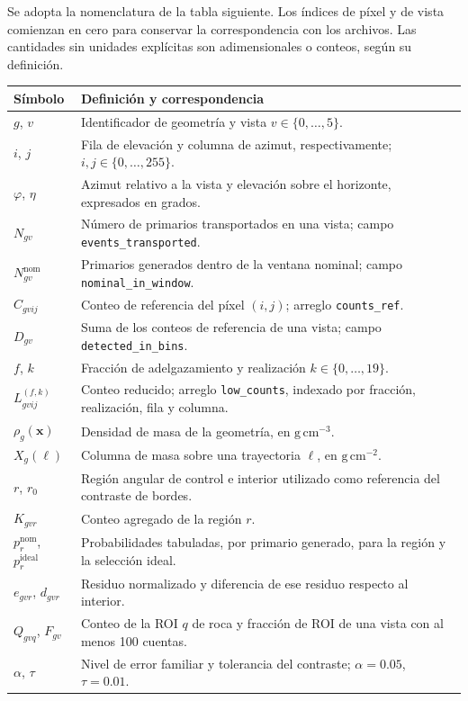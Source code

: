 \documentclass[11pt,a4paper]{article}
\begin{document}
Se adopta la nomenclatura de la tabla siguiente. Los índices de píxel y de vista comienzan en cero para conservar la correspondencia con los archivos. Las cantidades sin unidades explícitas son adimensionales o conteos, según su definición.

\begingroup\small\begin{longtable}{p{}p{}}
\toprule Símbolo & Definición y correspondencia \\ \midrule
\endhead
$g$, $v$ & Identificador de geometría y vista $v\in\{0,\ldots,5\}$. \\
$i$, $j$ & Fila de elevación y columna de azimut, respectivamente; $i,j\in\{0,\ldots,255\}$. \\
$\varphi$, $\eta$ & Azimut relativo a la vista y elevación sobre el horizonte, expresados en grados. \\
$N_{gv}$ & Número de primarios transportados en una vista; campo \texttt{events\_transported}. \\
$N^{\mathrm{nom}}_{gv}$ & Primarios generados dentro de la ventana nominal; campo \texttt{nominal\_in\_window}. \\
$C_{gvij}$ & Conteo de referencia del píxel $(i,j)$; arreglo \texttt{counts\_ref}. \\
$D_{gv}$ & Suma de los conteos de referencia de una vista; campo \texttt{detected\_in\_bins}. \\
$f$, $k$ & Fracción de adelgazamiento y realización $k\in\{0,\ldots,19\}$. \\
$L^{(f,k)}_{gvij}$ & Conteo reducido; arreglo \texttt{low\_counts}, indexado por fracción, realización, fila y columna. \\
$\rho_g(\boldsymbol{x})$ & Densidad de masa de la geometría, en $\mathrm{g\,cm^{-3}}$. \\
$X_g(\ell)$ & Columna de masa sobre una trayectoria $\ell$, en $\mathrm{g\,cm^{-2}}$. \\
$r$, $r_0$ & Región angular de control e interior utilizado como referencia del contraste de bordes. \\
$K_{gvr}$ & Conteo agregado de la región $r$. \\
$p^{\mathrm{nom}}_r$, $p^{\mathrm{ideal}}_r$ & Probabilidades tabuladas, por primario generado, para la región y la selección ideal. \\
$e_{gvr}$, $d_{gvr}$ & Residuo normalizado y diferencia de ese residuo respecto al interior. \\
$Q_{gvq}$, $F_{gv}$ & Conteo de la ROI $q$ de roca y fracción de ROI de una vista con al menos 100 cuentas. \\
$\alpha$, $\tau$ & Nivel de error familiar y tolerancia del contraste; $\alpha=0.05$, $\tau=0.01$. \\
\bottomrule
\end{longtable}\endgroup
\end{document}
